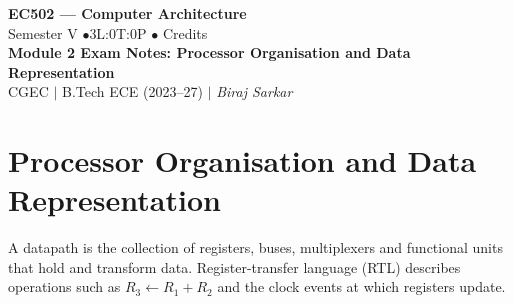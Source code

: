 \documentclass[12pt,a4paper]{article}
\begin{document}

\begin{center}
  {\LARGE\bfseries\color{myred} EC502 --- Computer Architecture}\\[5pt]
  {\normalsize\color{mydark} Semester V \quad$\bullet$\quad 3L:0T:0P \quad$\bullet$ Credits}\\[3pt]
  {\normalsize\color{myteal}\textbf{Module 2 Exam Notes: Processor Organisation and Data Representation}}\\[3pt]
  {\small\color{mydark} CGEC \;$|$\; B.Tech ECE (2023--27) \;$|$\; \textit{Biraj Sarkar}}
\end{center}
\vspace{2pt}
\noindent{\color{myred}\rule{\linewidth}{1.5pt}}
\vspace{2pt}

\hypersetup{linkcolor=mydark}
\tableofcontents
\hypersetup{linkcolor=myteal}
\newpage

\section{Processor Organisation and Data Representation}
\begin{tcolorbox}[defbox,title={Datapath and register-transfer language}]
A datapath is the collection of registers, buses, multiplexers and functional units that hold and transform data. Register-transfer language (RTL) describes operations such as $R_3\leftarrow R_1+R_2$ and the clock events at which registers update.
\end{tcolorbox}
\end{document}
